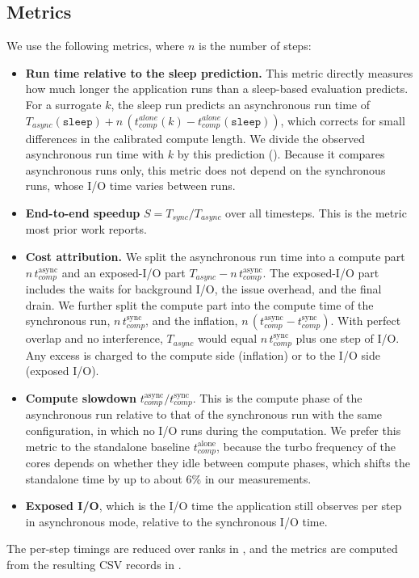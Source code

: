 \subsection{Metrics}
\label{sec:metrics}
We use the following metrics, where $n$ is the number of steps:
\begin{itemize}
  \item \textbf{Run time relative to the sleep prediction.} This metric
        directly measures how much longer the application runs than a
        sleep-based evaluation predicts. For a surrogate $k$, the sleep run
        predicts an asynchronous run time of
        $T_{async}(\texttt{sleep}) + n\,(t_{comp}^{alone}(k) -
        t_{comp}^{alone}(\texttt{sleep}))$, which corrects for small
        differences in the calibrated compute length. We divide the
        observed asynchronous run time with $k$ by this prediction
        (\srcExcess). Because
        it compares asynchronous runs only, this metric does not depend on
        the synchronous runs, whose I/O time varies between runs.
  \item \textbf{End-to-end speedup} $S = T_{sync}/T_{async}$ over all
        timesteps. This is the metric most prior work reports.
  \item \textbf{Cost attribution.} We split the asynchronous run time into a
        compute part $n\,t_{comp}^{\text{async}}$ and an exposed-I/O part
        $T_{async} - n\,t_{comp}^{\text{async}}$. The exposed-I/O part
        includes the waits for background I/O, the issue overhead, and the
        final drain. We further split the compute part into the compute time
        of the synchronous run, $n\,t_{comp}^{\text{sync}}$, and the
        inflation, $n\,(t_{comp}^{\text{async}} - t_{comp}^{\text{sync}})$.
        With perfect overlap and no interference, $T_{async}$ would equal
        $n\,t_{comp}^{\text{sync}}$ plus one step of I/O. Any excess is
        charged to the compute side (inflation) or to the I/O side (exposed
        I/O).
  \item \textbf{Compute slowdown}
        $t_{comp}^{\text{async}} / t_{comp}^{\text{sync}}$. This is the
        compute phase of the asynchronous run relative to that of the
        synchronous run with the same configuration, in which no I/O runs
        during the computation. We prefer this metric to the standalone
        baseline $t_{comp}^{\text{alone}}$, because the turbo frequency of
        the cores depends on whether they idle between compute phases, which
        shifts the standalone time by up to about 6\% in our measurements.
  \item \textbf{Exposed I/O}, which is the I/O time the application still
        observes per step in asynchronous mode, relative to the synchronous
        I/O time.
\end{itemize}
The per-step timings are reduced over ranks in \srcReduce, and the metrics
are computed from the resulting CSV records in \srcMetrics.
